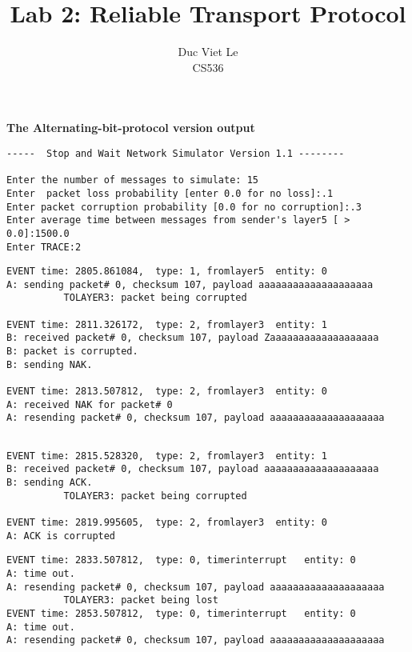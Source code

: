 \documentclass[12pt]{article}
\begin{document}
 
\title{Lab 2: Reliable Transport Protocol}
\author{Duc Viet Le\\ 
CS536}
 
\maketitle
\noindent
\large{\textbf{The Alternating-bit-protocol version output}}
\normalsize

\begin{Verbatim}[frame=single, rulecolor=\color{green}, label=Input] 
-----  Stop and Wait Network Simulator Version 1.1 -------- 

Enter the number of messages to simulate: 15
Enter  packet loss probability [enter 0.0 for no loss]:.1
Enter packet corruption probability [0.0 for no corruption]:.3
Enter average time between messages from sender's layer5 [ > 0.0]:1500.0
Enter TRACE:2
\end{Verbatim}
\begin{Verbatim}[frame=single, rulecolor=\color{red}, label=Handle Corruption] 
EVENT time: 2805.861084,  type: 1, fromlayer5  entity: 0
A: sending packet# 0, checksum 107, payload aaaaaaaaaaaaaaaaaaaa
          TOLAYER3: packet being corrupted

EVENT time: 2811.326172,  type: 2, fromlayer3  entity: 1
B: received packet# 0, checksum 107, payload Zaaaaaaaaaaaaaaaaaaa
B: packet is corrupted.
B: sending NAK.

EVENT time: 2813.507812,  type: 2, fromlayer3  entity: 0
A: received NAK for packet# 0
A: resending packet# 0, checksum 107, payload aaaaaaaaaaaaaaaaaaaa
\end{Verbatim}
\begin{verbatim}

EVENT time: 2815.528320,  type: 2, fromlayer3  entity: 1
B: received packet# 0, checksum 107, payload aaaaaaaaaaaaaaaaaaaa
B: sending ACK.
          TOLAYER3: packet being corrupted

EVENT time: 2819.995605,  type: 2, fromlayer3  entity: 0
A: ACK is corrupted

\end{verbatim}
\begin{Verbatim}[frame=single, rulecolor=\color{blue}, label=Handle Loss] 
EVENT time: 2833.507812,  type: 0, timerinterrupt   entity: 0
A: time out. 
A: resending packet# 0, checksum 107, payload aaaaaaaaaaaaaaaaaaaa
          TOLAYER3: packet being lost
EVENT time: 2853.507812,  type: 0, timerinterrupt   entity: 0
A: time out. 
A: resending packet# 0, checksum 107, payload aaaaaaaaaaaaaaaaaaaa
\end{Verbatim}
\end{document}
